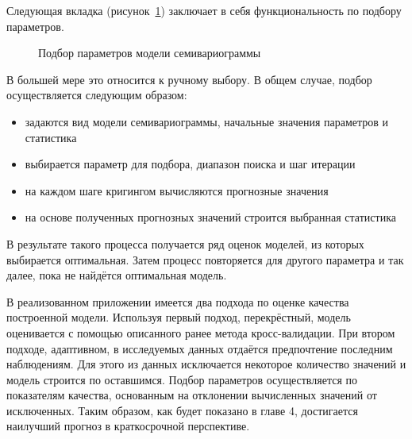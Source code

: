 Следующая вкладка (рисунок~\ref{img:mod_fit}) заключает в себя функциональность по подбору параметров.
\begin{figure}[ht]
\caption{Подбор параметров модели семивариограммы}
\label{img:mod_fit}
\end{figure}
В большей мере это относится к ручному выбору. В общем случае, подбор осуществляется следующим образом:
\begin{itemize}
	\item задаются вид модели семивариограммы, начальные значения параметров и статистика
	\item выбирается параметр для подбора, диапазон поиска и шаг итерации
	\item на каждом шаге кригингом вычисляются прогнозные значения
	\item на основе полученных прогнозных значений строится выбранная статистика
\end{itemize}
В результате такого процесса получается ряд оценок моделей, из которых выбирается оптимальная. Затем процесс повторяется для другого параметра и так далее, пока не найдётся оптимальная модель.

В реализованном приложении имеется два подхода по оценке качества построенной модели. Используя первый подход, перекрёстный, модель оценивается с помощью описанного ранее метода кросс-валидации. При втором подходе, адаптивном, в исследуемых данных отдаётся предпочтение последним наблюдениям. Для этого из данных исключается некоторое количество значений и модель строится по оставшимся. Подбор параметров осуществляется по показателям качества, основанным на отклонении вычисленных значений от исключенных. Таким образом, как будет показано в главе 4, достигается наилучший прогноз в краткосрочной перспективе.

